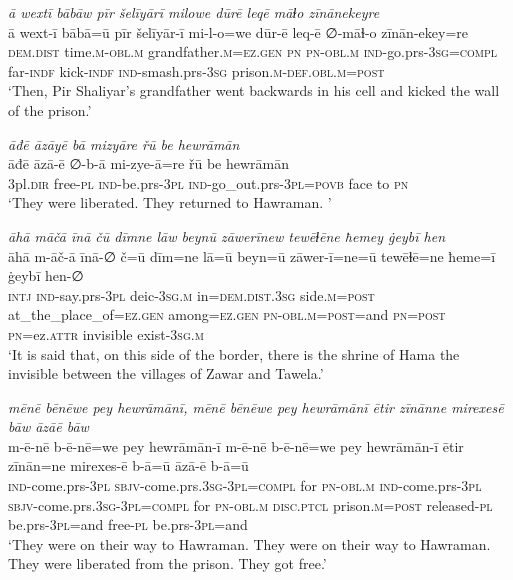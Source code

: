 \ea \label{BP.168}
\textit{ā wextī bābāw pīr šelīyārī milowe dūrē leqē māɫo zīnānekeyre} \\ 
\gll ā wext-ī bābā=ū pīr šelīyār-ī mi-l-o=we dūr-ē leq-ē ∅-māɫ-o zīnān-ekey=re \\ 
 \textsc{dem.dist} time\textsc{.m}\textsc{-obl}\textsc{.m} grandfather\textsc{.m}\textsc{=ez.gen} \textsc{pn} \textsc{pn}\textsc{-obl}\textsc{.m} \textsc{ind-}go.prs\textsc{-3sg}\textsc{=compl} far\textsc{-indf} kick\textsc{-indf} \textsc{ind-}smash.prs\textsc{-3sg} prison\textsc{.m}\textsc{-def}\textsc{.obl}\textsc{.m}\textsc{=\textsc{post}} \\ 
\glt `Then, Pir Shaliyar’s grandfather went backwards in his cell and kicked the wall of the prison.'
\z 
 
\ea \label{BP.175}
\textit{āđē āzāyē bā mizyāre řū be hewrāmān} \\ 
\gll āđē āzā-ē ∅-b-ā mi-zye-ā=re řū be hewrāmān \\ 
 3pl\textsc{.dir} free\textsc{\textsc{-pl}} \textsc{ind-}be.prs\textsc{-3pl} \textsc{ind-}go\_out.prs\textsc{-3pl}\textsc{=\textsc{povb}} face to \textsc{pn} \\ 
\glt `They were liberated. They returned to Hawraman. '
\z 
 
\ea \label{BP.178}
\textit{āhā māčā īnā čū dīmne lāw beynū zāwerīnew tewēɫēne ħemey ġeybī hen} \\ 
\gll āhā m-āč-ā īnā-∅ č=ū dīm=ne lā=ū beyn=ū zāwer-ī=ne=ū tewēɫē=ne ħeme=ī ġeybī hen-∅ \\ 
 \textsc{intj} \textsc{ind-}say.prs\textsc{-3pl} deic\textsc{-3sg}\textsc{.m} in=\textsc{dem.dist}\textsc{.3sg} side\textsc{.m}\textsc{=\textsc{post}} at\_the\_place\_of\textsc{=ez.gen} among\textsc{=ez.gen} \textsc{pn}\textsc{-obl}\textsc{.m}\textsc{=\textsc{post}}=and \textsc{pn}\textsc{=\textsc{post}} \textsc{pn}=ez.\textsc{attr} invisible exist\textsc{-3sg}\textsc{.m} \\ 
\glt `It is said that, on this side of the border, there is the shrine of Hama the invisible between the villages of Zawar and Tawela.'
\z 
 
\ea \label{BP.179}
\textit{mēnē bēnēwe pey hewrāmānī, mēnē bēnēwe pey hewrāmānī ētir zīnānne mirexesē bāw āzāē bāw} \\ 
\gll m-ē-nē b-ē-nē=we pey hewrāmān-ī m-ē-nē b-ē-nē=we pey hewrāmān-ī ētir zīnān=ne mirexes-ē b-ā=ū āzā-ē b-ā=ū \\ 
 \textsc{ind-}come.prs\textsc{-3pl} \textsc{sbjv-}come.prs\textsc{.3sg}\textsc{-3pl}\textsc{=compl} for \textsc{pn}\textsc{-obl}\textsc{.m} \textsc{ind-}come.prs\textsc{-3pl} \textsc{sbjv-}come.prs\textsc{.3sg}\textsc{-3pl}\textsc{=compl} for \textsc{pn}\textsc{-obl}\textsc{.m} \textsc{disc.ptcl} prison\textsc{.m}\textsc{=\textsc{post}} released\textsc{\textsc{-pl}} be.prs\textsc{-3pl}=and free\textsc{\textsc{-pl}} be.prs\textsc{-3pl}=and \\ 
\glt `They were on their way to Hawraman. They were on their way to Hawraman. They were liberated from the prison. They got free.'
\z 
 
